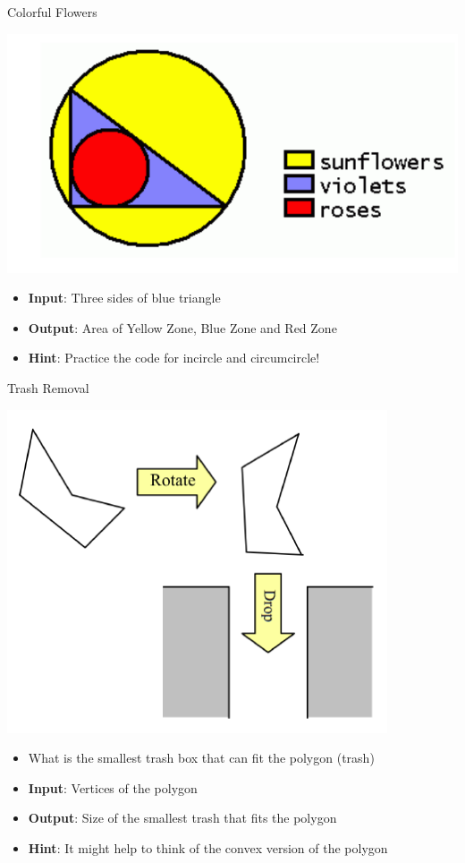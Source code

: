 \begin{frame}{Colorful Flowers}
  \begin{center}
    \includegraphics[width=.5\textwidth]{../img/problem_colourful}
  \end{center}
  \begin{itemize}
    \item {\bf Input}: Three sides of blue triangle
    \item {\bf Output}: Area of Yellow Zone, Blue Zone and Red Zone
    \item {\bf Hint}: Practice the code for incircle and circumcircle!
  \end{itemize}
\end{frame}

\begin{frame}{Trash Removal}
  \begin{center}
    \includegraphics[width=.5\textwidth]{../img/problem_trash}
  \end{center}
  \begin{itemize}
    \item What is the smallest trash box that can fit the polygon (trash)
    \item {\bf Input}: Vertices of the polygon
    \item {\bf Output}: Size of the smallest trash that fits the polygon
    \item {\bf Hint}: It might help to think of the convex version of the polygon
  \end{itemize}
\end{frame}

